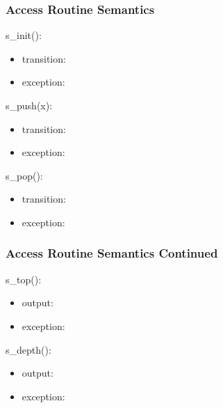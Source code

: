 \documentclass[t,12pt,numbers,fleqn]{beamer}
\begin{document}
\begin{frame}
\frametitle{Access Routine Semantics}

s\_init():
\begin{itemize}
\item transition: 
\item exception: 
\end{itemize}

\noindent s\_push(x):
\begin{itemize}
\item transition: 
\item exception: 
\end{itemize}

\noindent s\_pop():
\begin{itemize}
\item transition: 
\item exception: 
\end{itemize}

\end{frame}


\begin{frame}
\frametitle{Access Routine Semantics Continued}

\noindent s\_top():
\begin{itemize}
\item output: 
\item exception: 
\end{itemize}

\noindent s\_depth():
\begin{itemize}
\item output: 
\item exception: 
\end{itemize}

\end{frame}

\end{document}
